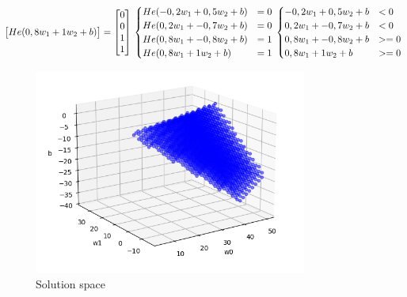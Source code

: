 \documentclass{article}
\begin{document}
\begin{math}
\begin{bmatrix}
                He(0,8w_{1} + 1w_{2} + b)
            \end{bmatrix}
            = 
                \begin{bmatrix}
                0 \\
                0 \\
                1 \\
                1
            \end{bmatrix}
            \\
            \\
            \\
            \begin{cases}
            He(-0,2w_{1} + 0,5w_{2} + b) &= 0 \\
            He(0,2w_{1} + -0,7w_{2} + b) &= 0 \\
            He(0,8w_{1} + -0,8w_{2} + b) &= 1 \\
            He(0,8w_{1} + 1w_{2} + b) &= 1 \\
            \end{cases}
            \\
            \\
            \\
            \begin{cases}
            -0,2w_{1} + 0,5w_{2} + b &< 0 \\
            0,2w_{1} + -0,7w_{2} + b &< 0 \\
            0,8w_{1} + -0,8w_{2} + b &>= 0 \\
            0,8w_{1} + 1w_{2} + b &>= 0 \\
            \end{cases}
        \end{math}
        
        \begin{figure}[H]
            \centering
            \includegraphics[width=0.8\textwidth]{solution-space.png}
            \caption{Solution space}
            \label{fig:ml}
        \end{figure}
\end{document}
